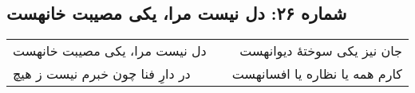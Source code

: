 \begin{center}
\section*{شماره ۲۶: دل نیست مرا، یکی مصیبت خانهست}
\label{sec:026}
\begin{longtable}{l p{0.5cm} r}
دل نیست مرا، یکی مصیبت خانهست
&&
جان نیز یکی سوختهٔ دیوانهست
\\
در دارِ فنا چون خبرم نیست ز هیچ
&&
کارم همه یا نظاره یا افسانهست
\\
\end{longtable}
\end{center}
